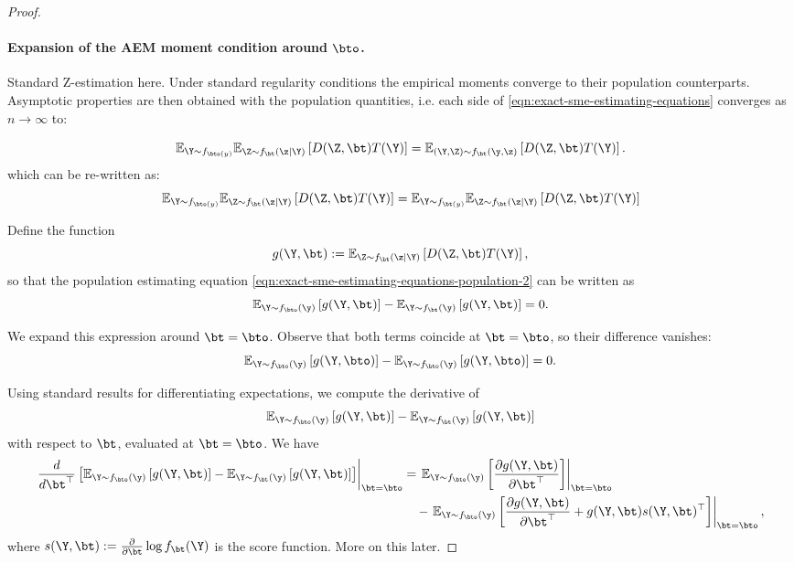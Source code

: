 \begin{proof}


\paragraph{Expansion of the AEM moment condition around $\bto$.}
Standard Z-estimation here. Under standard regularity conditions the empirical moments converge to their population counterparts. Asymptotic properties are then obtained with the population quantities, i.e. each side of \eqref{eqn:exact-sme-estimating-equations} converges as $n\to\infty$ to:

\begin{equation}
\mathbb{E}_{\Y\sim f_{\bto(y)}}\mathbb{E}_{\Z \sim f_\bt(\z \mid \Y)} \left[
    D(\Z, \bt)
    T(\Y)
\right]
=
\mathbb{E}_{(\Y, \Z) \sim f_\bt(\y, \z)} \left[
    D(\Z, \bt)
    T(\Y)
\right].
\label{eqn:exact-sme-estimating-equations-population}
\end{equation}
%
which can be re-written as:
\begin{equation}
\mathbb{E}_{\Y\sim f_{\bto(y)}}\mathbb{E}_{\Z \sim f_\bt(\z \mid \Y)} \left[
    D(\Z, \bt)
    T(\Y)
\right]
=
\mathbb{E}_{\Y\sim f_{\bt(y)}}\mathbb{E}_{\Z \sim f_\bt(\z \mid \Y)} \left[
    D(\Z, \bt)
    T(\Y)
\right]
\label{eqn:exact-sme-estimating-equations-population-2}
\end{equation}

\noindent Define the function
\[
g(\Y, \bt) := \mathbb{E}_{\Z \sim f_\bt(\z \mid \Y)} \left[
    D(\Z, \bt)
    T(\Y)
\right],
\]
so that the population estimating equation \eqref{eqn:exact-sme-estimating-equations-population-2} can be written as
\[
\mathbb{E}_{\Y \sim f_{\bto}(\y)} \left[ g(\Y, \bt) \right]
-
\mathbb{E}_{\Y \sim f_{\bt}(\y)} \left[ g(\Y, \bt) \right] = 0.
\]

We expand this expression around \( \bt = \bto \). Observe that both terms coincide at \( \bt = \bto \), so their difference vanishes:
\[
\mathbb{E}_{\Y \sim f_{\bto}(\y)} \left[ g(\Y, \bto) \right]
-
\mathbb{E}_{\Y \sim f_{\bto}(\y)} \left[ g(\Y, \bto) \right] = 0.
\]

Using standard results for differentiating expectations, we compute the derivative of
\[
\mathbb{E}_{\Y \sim f_{\bto}(\y)} \left[ g(\Y, \bt) \right]
-
\mathbb{E}_{\Y \sim f_{\bt}(\y)} \left[ g(\Y, \bt) \right]
\]
with respect to \( \bt \), evaluated at \( \bt = \bto \). We have
\begin{align*}
\left. \frac{d}{d\bt^\top} \left[
\mathbb{E}_{\Y \sim f_{\bto}(\y)} \left[ g(\Y, \bt) \right]
-
\mathbb{E}_{\Y \sim f_{\bt}(\y)} \left[ g(\Y, \bt) \right]
\right] \right|_{\bt = \bto}
&=
\left. \mathbb{E}_{\Y \sim f_{\bto}(\y)} \left[ \frac{\partial g(\Y, \bt)}{\partial \bt^\top} \right] \right|_{\bt = \bto} \\
&\quad -
\left. \mathbb{E}_{\Y \sim f_{\bto}(\y)} \left[ \frac{\partial g(\Y, \bt)}{\partial \bt^\top} + g(\Y, \bt) s(\Y, \bt)^\top \right] \right|_{\bt = \bto},
\end{align*}
where \( s(\Y, \bt) := \frac{\partial}{\partial \bt} \log f_\bt(\Y) \) is the score function. More on this later.


\end{proof}
